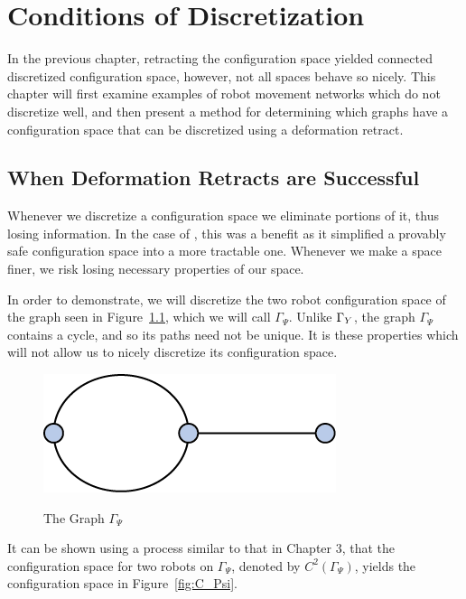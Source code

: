 \chapter{Conditions of Discretization}
In the previous chapter, retracting the configuration space yielded connected discretized configuration space, however, not all spaces behave so nicely. This chapter will first examine examples of robot movement networks which do not discretize well, and then present a method for determining which graphs have a configuration space that can be discretized using a deformation retract.

\section{When Deformation Retracts are Successful}
Whenever we discretize a configuration space we eliminate portions of it, thus losing information. In the case of \C, this was a benefit as it simplified a provably safe configuration space into a more tractable one. Whenever we make a space finer, we risk losing necessary properties of our space. 

In order to demonstrate, we will discretize the two robot configuration space of the graph seen in Figure~\ref{fig:bad}, which we will call $\Gamma_{\Psi}$. Unlike $\Gamma_Y$, the graph $\Gamma_{\Psi}$ contains a cycle, and so its paths need not be unique. It is these properties which will not allow us to nicely discretize its configuration space. 

\begin{figure}[h]
\centering
\caption{The Graph $\Gamma_{\Psi}$}
\includegraphics[scale=1]{Bad.png}
\label{fig:bad}
\end{figure}

It can be shown using a process similar to that in Chapter 3, that the configuration space for two robots on $\Gamma_{\Psi}$, denoted by $C^2(\Gamma_{\Psi})$, yields the configuration space in Figure~\ref{fig:C_Psi}.

